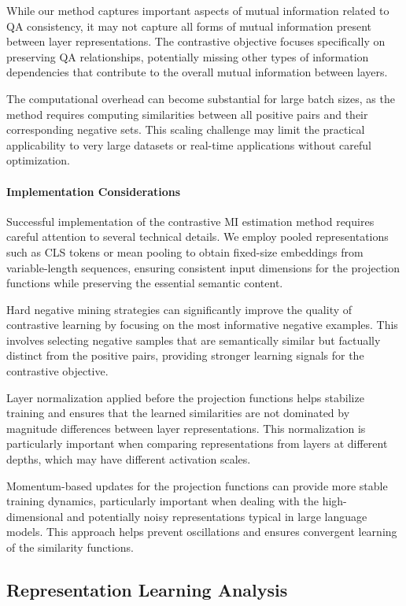 While our method captures important aspects of mutual information related to QA consistency, it may not capture all forms of mutual information present between layer representations. The contrastive objective focuses specifically on preserving QA relationships, potentially missing other types of information dependencies that contribute to the overall mutual information between layers.

The computational overhead can become substantial for large batch sizes, as the method requires computing similarities between all positive pairs and their corresponding negative sets. This scaling challenge may limit the practical applicability to very large datasets or real-time applications without careful optimization.

\paragraph{Implementation Considerations}

Successful implementation of the contrastive MI estimation method requires careful attention to several technical details. We employ pooled representations such as CLS tokens or mean pooling to obtain fixed-size embeddings from variable-length sequences, ensuring consistent input dimensions for the projection functions while preserving the essential semantic content.

Hard negative mining strategies can significantly improve the quality of contrastive learning by focusing on the most informative negative examples. This involves selecting negative samples that are semantically similar but factually distinct from the positive pairs, providing stronger learning signals for the contrastive objective.

Layer normalization applied before the projection functions helps stabilize training and ensures that the learned similarities are not dominated by magnitude differences between layer representations. This normalization is particularly important when comparing representations from layers at different depths, which may have different activation scales.

Momentum-based updates for the projection functions can provide more stable training dynamics, particularly important when dealing with the high-dimensional and potentially noisy representations typical in large language models. This approach helps prevent oscillations and ensures convergent learning of the similarity functions.

\subsection{Representation Learning Analysis}
\label{subsec:repr_analysis}

